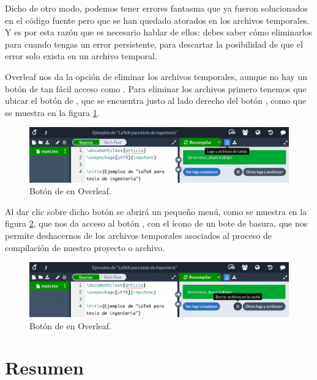 Dicho de otro modo, podemos tener errores fantasma que ya fueron solucionados en el código fuente pero que se han quedado atorados en los archivos temporales. Y es por esta razón que es necesario hablar de ellos: debes saber cómo eliminarlos para cuando tengas un error persistente, para descartar la posibilidad de que el error solo exista en un archivo temporal.

Overleaf nos da la opción de eliminar los archivos temporales, aunque no hay un botón de tan fácil acceso como . Para eliminar los archivos primero tenemos que ubicar el botón de , que se encuentra justo al lado derecho del botón , como que se muestra en la figura \ref{fig:overleaf_boton_log}.

\begin{figure}[ht!]
	\centering
	\includegraphics[width=\linewidth]{img/overleaf_boton_log_300ppi.png}
	\caption{Botón de  en Overleaf.}
	\label{fig:overleaf_boton_log}
\end{figure}

Al dar clic sobre dicho botón se abrirá un pequeño menú, como se muestra en la figura \ref{fig:overleaf_boton_cache}, que nos da acceso al botón , con el ícono de un bote de basura, que nos permite deshacernos de los archivos temporales asociados al proceso de compilación de nuestro proyecto o archivo.

\begin{figure}[ht!]
	\centering
	\includegraphics[width=\linewidth]{img/overleaf_boton_cache_300ppi.png}
	\caption{Botón de  en Overleaf.}
	\label{fig:overleaf_boton_cache}
\end{figure}



\newpage
\section*{Resumen}



